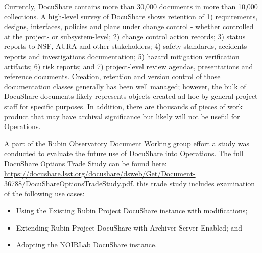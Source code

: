 Currently, DocuShare contains more than 30,000 documents in more than 10,000 collections. A high-level survey of DocuShare shows retention of 1) requirements, designs, interfaces, policies and plans under change control - whether controlled at the project- or subsystem-level; 2) change control action records; 3) status reports to NSF, AURA and other stakeholders; 4) safety standards, accidents reports and investigations documentation; 5) hazard mitigation verification artifacts; 6) risk reports; and 7) project-level review agendas, presentations and reference documents. Creation, retention and version control of those documentation classes generally has been well managed; however, the bulk of DocuShare documents likely represents objects created ad hoc by general project staff for specific purposes. In addition, there are thousands of pieces of work product that may have archival significance but likely will not be useful for Operations.

A part of the Rubin Observatory Document Working group effort a study was conducted to evaluate the future use of DocuShare into Operations.  The full DocuShare Options Trade Study can be found here:  \url{https://docushare.lsst.org/docushare/dsweb/Get/Document-36788/DocuShareOptionsTradeStudy.pdf}.  this trade study includes examination of the following use cases:

\begin{itemize}
	\item Using the Existing Rubin Project DocuShare instance with modifications;
	\item Extending Rubin Project DocuShare with Archiver Server Enabled; and
	\item Adopting the NOIRLab DocuShare instance.
\end{itemize}

